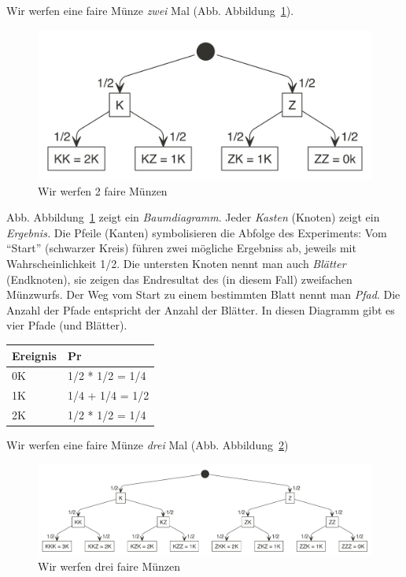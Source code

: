 \documentclass[
  a4paper,
  DIV=11]{scrreprt}
\theoremstyle{definition}
\theoremstyle{remark}
\begin{document}
Wir werfen eine faire Münze \emph{zwei} Mal (Abb.
Abbildung~\ref{fig-2muenzen}).

\begin{figure}

{\centering \includegraphics{./img/muenz1.png}

}

\caption{\label{fig-2muenzen}Wir werfen 2 faire Münzen}

\end{figure}

Abb. Abbildung~\ref{fig-2muenzen} zeigt ein \emph{Baumdiagramm}. Jeder
\emph{Kasten} (Knoten) zeigt ein \emph{Ergebnis.} Die Pfeile (Kanten)
symbolisieren die Abfolge des Experiments: Vom ``Start'' (schwarzer
Kreis) führen zwei mögliche Ergebniss ab, jeweils mit Wahrscheinlichkeit
1/2. Die untersten Knoten nennt man auch \emph{Blätter} (Endknoten), sie
zeigen das Endresultat des (in diesem Fall) zweifachen Münzwurfs. Der
Weg vom Start zu einem bestimmten Blatt nennt man \emph{Pfad}. Die
Anzahl der Pfade entspricht der Anzahl der Blätter. In diesen Diagramm
gibt es vier Pfade (und Blätter).

\begin{longtable}[]{@{}ll@{}}
\toprule()
Ereignis & Pr \\
\midrule()
\endhead
0K & 1/2 * 1/2 = 1/4 \\
1K & 1/4 + 1/4 = 1/2 \\
2K & 1/2 * 1/2 = 1/4 \\
\bottomrule()
\end{longtable}

Wir werfen eine faire Münze \emph{drei} Mal (Abb.
Abbildung~\ref{fig-3muenzen})

\begin{figure}

{\centering \includegraphics{./img/muenz2.png}

}

\caption{\label{fig-3muenzen}Wir werfen drei faire Münzen}

\end{figure}
\end{document}
